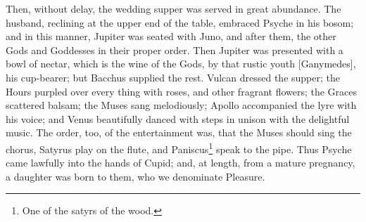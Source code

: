 \documentclass{article}
\begin{document}
Then, without delay, the wedding supper was served in great abundance. The
husband, reclining at the upper end of the table, embraced Psyche in his bosom;
and in this manner, Jupiter was seated with Juno, and after them, the other
Gods and Goddesses in their proper order. Then Jupiter was presented with a
bowl of nectar, which is the wine of the Gods, by that rustic youth
[Ganymedes], his cup-bearer; but Bacchus supplied the rest. Vulcan dressed the
supper; the Hours purpled over every thing with roses, and other fragrant
flowers; the Graces scattered balsam; the Muses sang melodiously; Apollo
accompanied the lyre with his voice; and Venus beautifully danced with steps in
unison with the delightful music. The order, too, of the entertainment was,
that the Muses should sing the chorus, Satyrus play on the flute, and
Paniscus\footnote{One of the satyrs of the wood.} speak to the pipe. Thus
Psyche came lawfully into the hands of Cupid; and, at length, from a mature
pregnancy, a daughter was born to them, who we denominate Pleasure.
\end{document}
